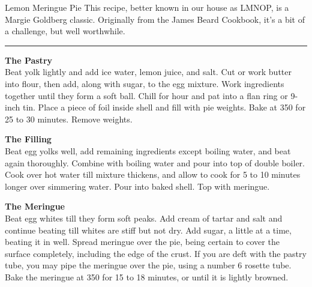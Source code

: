 \begin{recipe}{Lemon Meringue Pie}{}{}
\freeform
This recipe, better known in our house as LMNOP, is a Margie Goldberg classic. Originally from the James Beard Cookbook, it's a bit of a challenge, but well worthwhile.\\
\rule{\textwidth}{0.05pt}


\textbf{The Pastry}
\\
Beat yolk lightly and add ice water, lemon juice, and salt. Cut or work butter into flour, then add, along with sugar, to the egg mixture. Work ingredients together until they form a soft ball. Chill for  hour and pat into a flan ring or 9-inch tin. Place a piece of foil inside shell and fill with pie weights. Bake at 350 for 25 to 30 minutes. Remove weights.



\textbf{The Filling}\\
Beat egg yolks well, add remaining ingredients except boiling water, and beat again thoroughly. Combine with boiling water and pour into top of double boiler. Cook over hot water till mixture thickens, and allow to cook for 5 to 10 minutes longer over simmering water. Pour into baked shell. Top with meringue.
\\


\textbf{The Meringue}\\
Beat egg whites till they form soft peaks. Add cream of tartar and salt and continue beating till whites are stiff but not dry. Add sugar, a little at a time, beating it in well. Spread meringue over the pie, being certain to cover the surface completely, including the edge of the crust. If you are deft with the pastry tube, you may pipe the meringue over the pie, using a number 6 rosette tube. Bake the meringue at 350 for 15 to 18 minutes, or until it is lightly browned.

\end{recipe}
